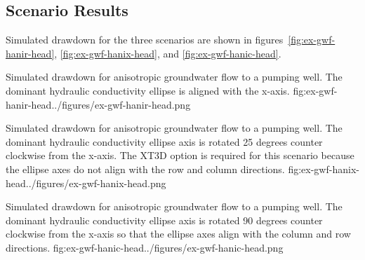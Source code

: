 \subsection{Scenario Results}

Simulated drawdown for the three scenarios are shown in figures~\ref{fig:ex-gwf-hanir-head},  \ref{fig:ex-gwf-hanix-head}, and \ref{fig:ex-gwf-hanic-head}.

\begin{StandardFigure}{
                                     Simulated drawdown for anisotropic groundwater flow to a pumping well.  The dominant hydraulic conductivity ellipse is aligned with the x-axis.
                                     }{fig:ex-gwf-hanir-head}{../figures/ex-gwf-hanir-head.png}
\end{StandardFigure}                                 

\begin{StandardFigure}{
                                     Simulated drawdown for anisotropic groundwater flow to a pumping well.  The dominant hydraulic conductivity ellipse axis is rotated 25 degrees counter clockwise from the x-axis.  The XT3D option is required for this scenario because the ellipse axes do not align with the row and column directions.
                                     }{fig:ex-gwf-hanix-head}{../figures/ex-gwf-hanix-head.png}
\end{StandardFigure}                                 

\begin{StandardFigure}{
                                     Simulated drawdown for anisotropic groundwater flow to a pumping well.  The dominant hydraulic conductivity ellipse axis is rotated 90 degrees counter clockwise from the x-axis so that the ellipse axes align with the column and row directions.
                                     }{fig:ex-gwf-hanic-head}{../figures/ex-gwf-hanic-head.png}
\end{StandardFigure}                                 


                
